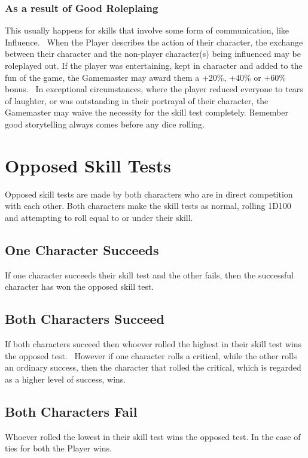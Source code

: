 \subsubsection{As a result of Good Roleplaing}
This usually happens for skills that involve some form of communication, like Influence.  When the Player describes the action of their character, the exchange between their character and the non-player character(s) being influenced may be roleplayed out. If the player was entertaining, kept in character and added to the fun of the game, the Gamemaster may award them a +20\%, +40\% or +60\% bonus.  In exceptional circumstances, where the player reduced everyone to tears of laughter, or was outstanding in their portrayal of their character, the Gamemaster may waive the necessity for the skill test completely. Remember good storytelling always comes before any dice rolling. 


\section{Opposed Skill Tests}
Opposed skill tests are made by both characters who are in direct competition with each other. Both characters make the skill tests as normal, rolling 1D100 and attempting to roll equal to or under their skill.

\subsection{One Character Succeeds}
If one character succeeds their skill test and the other fails, then the successful character has won the opposed skill test. 


\subsection{Both Characters Succeed}
If both characters succeed then whoever rolled the highest in their skill test wins the opposed test.  However if one character rolls a critical, while the other rolls an ordinary success, then the character that rolled the critical, which is regarded as a higher level of success, wins. 

\subsection{Both Characters Fail}
Whoever rolled the lowest in their skill test wins the opposed test. In the case of ties for both the Player wins.

